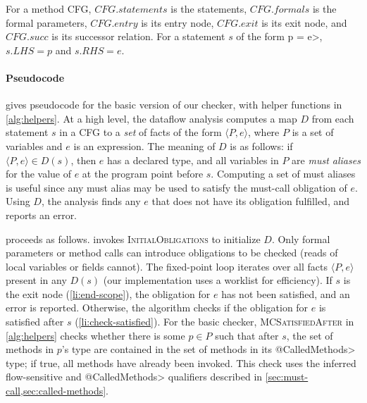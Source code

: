 For a method CFG, $\mathit{CFG.statements}$ is the statements,
$\mathit{CFG.formals}$ is the formal parameters,
$\mathit{CFG.entry}$ is its entry node,
$\mathit{CFG.exit}$ is its exit node, and
$\mathit{CFG.succ}$ is its successor relation.
For a statement
$s$ of the form \<p = e>, $s.LHS = p$ and $s.RHS = e$.

\paragraph{Pseudocode}  gives pseudocode for the
basic version of our checker, with helper functions in \cref{alg:helpers}.  At a
high level, the dataflow analysis computes a map $D$ from each statement $s$ in
a CFG to a \emph{set} of facts of the form $\langle P, e \rangle$, where $P$ is
a set of variables and $e$ is an expression.  The meaning
of $D$ is as follows: if $\langle P, e \rangle
\in D(s)$, then $e$ has a declared \MustCall type, and all variables in $P$
are \emph{must aliases} for the value of $e$ at the program point before $s$.
Computing a set of must aliases is useful since any must alias may be used to
satisfy the must-call obligation of $e$.  Using $D$, the analysis finds any $e$
that does not have its \MustCall obligation fulfilled, and reports an error.

 proceeds as follows.  
invokes \textsc{InitialObligations} to initialize $D$.  Only formal parameters
or method calls can introduce obligations to be checked (reads of local
variables or fields cannot).
The fixed-point loop
iterates over all facts $\langle P, e \rangle$ present in any
$D(s)$ (our implementation uses a worklist for efficiency).  If $s$ is the exit
node (\cref{li:end-scope}), the obligation for $e$ has not been satisfied, and
an error is reported.  Otherwise, the algorithm checks if the obligation for $e$
is satisfied after $s$ (\cref{li:check-satisfied}).  For the basic checker,
\textsc{MCSatisfiedAfter} in \cref{alg:helpers} checks whether there is some $p
\in P$ such that after $s$, the set of methods in $p$'s \MustCall type are contained
in the set of methods in its
\<@CalledMethods> type; if true, all \MustCall methods have already been
invoked.  This check uses the inferred flow-sensitive \MustCall and
\<@CalledMethods> qualifiers described in
\cref{sec:must-call,sec:called-methods}.

